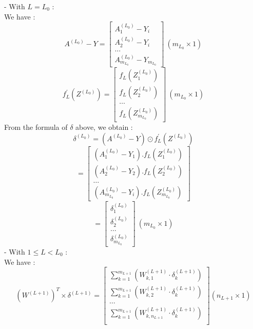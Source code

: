 \documentclass{article}
\begin{document}
    - With $L = L_0$ :
    \\
    We have :
        \[
            A^{(L_0)} - Y = 
            \begin{bmatrix}
                A^{(L_0)}_1 - Y_i  \\ 
                A^{(L_0)}_2 - Y_i \\ 
                \hdots \\ 
                A^{(L_0)}_{m_{L_0}} - Y_{m_{L_0}} 
            \end{bmatrix} \ (m_{L_0} \times 1)
        \]
        \[
            f^{\prime}_L\left(Z^{(L_0)}\right) = 
            \begin{bmatrix}
                f_L\left(Z^{(L_0)}_1\right)  \\ 
                f_L\left(Z^{(L_0)}_2\right) \\ 
                \hdots \\ 
                f_L\left(Z^{(L_0)}_{m_{L_0}}\right)
            \end{bmatrix} \ (m_{L_0} \times 1)
        \]
    From the formula of $\delta$ above, we obtain :
        \[
            \delta^{(L_0)} = \left(A^{(L_0)} - Y\right) \odot f^{\prime}_L\left(Z^{(L_0)}\right) 
        \]
        \[
            = \begin{bmatrix}
                \left(A^{(L_0)}_1 - Y_1\right) . f_L\left(Z^{(L_0)}_1\right)  \\ 
                \left(A^{(L_0)}_2 - Y_2\right) . f_L\left(Z^{(L_0)}_2\right) \\ 
                \hdots \\ 
                \left(A^{(L_0)}_{m_{L_0}} - Y_i\right) . f_L\left(Z^{(L_0)}_{m_{L_0}}\right)
            \end{bmatrix}
        \]
        \[
            = \begin{bmatrix}
                \delta^{(L_0)}_1  \\ 
                \delta^{(L_0)}_2 \\ 
                \hdots \\ 
                \delta^{(L_0)}_{m_{L_0}}
            \end{bmatrix} \ (m_{L_0} \times 1)
        \]
    - With  $ 1 \le L < L_0$ :
    \\
    We have :
        \[
            \left(W^{(L + 1)}\right)^T \times \delta^{(L + 1)} 
            =\begin{bmatrix}
                \sum_{k = 1}^{m_{L+1}}\left(
                    W^{(L + 1)}_{k, 1} \cdot \delta^{(L + 1)}_k  
                \right) \\
                \sum_{k = 1}^{m_{L+1}}\left(
                    W^{(L + 1)}_{k, 2} \cdot \delta^{(L + 1)}_k  
                \right) \\
                \hdots \\
                \sum_{k = 1}^{m_{L+1}}\left(
                    W^{(L + 1)}_{k, {n_{L+1}}} \cdot \delta^{(L + 1)}_k  
                \right) \\
            \end{bmatrix} (n_{L+1} \times 1)
        \]
\end{document}
